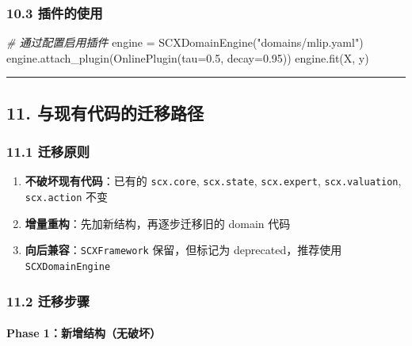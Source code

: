 \documentclass[
  12pt,
]{ctexart}
\newenvironment{Shaded}{}{}
\newcommand{\CommentTok}[1]{\textcolor[rgb]{0.38,0.63,0.69}{\textit{#1}}}
\newcommand{\FloatTok}[1]{\textcolor[rgb]{0.25,0.63,0.44}{#1}}
\newcommand{\NormalTok}[1]{#1}
\newcommand{\OperatorTok}[1]{\textcolor[rgb]{0.40,0.40,0.40}{#1}}
\newcommand{\StringTok}[1]{\textcolor[rgb]{0.25,0.44,0.63}{#1}}
\providecommand{\tightlist}{%
  \setlength{\itemsep}{0pt}\setlength{\parskip}{0pt}}
\begin{document}
\subsubsection{10.3 插件的使用}\label{ux63d2ux4ef6ux7684ux4f7fux7528}

\begin{Shaded}
\begin{Highlighting}[]
\CommentTok{\# 通过配置启用插件}
\NormalTok{engine }\OperatorTok{=}\NormalTok{ SCXDomainEngine(}\StringTok{"domains/mlip.yaml"}\NormalTok{)}
\NormalTok{engine.attach\_plugin(OnlinePlugin(tau}\OperatorTok{=}\FloatTok{0.5}\NormalTok{, decay}\OperatorTok{=}\FloatTok{0.95}\NormalTok{))}
\NormalTok{engine.fit(X, y)}
\end{Highlighting}
\end{Shaded}

\begin{center}\rule{0.5\linewidth}{0.5pt}\end{center}

\subsection{11.
与现有代码的迁移路径}\label{ux4e0eux73b0ux6709ux4ee3ux7801ux7684ux8fc1ux79fbux8defux5f84}

\subsubsection{11.1 迁移原则}\label{ux8fc1ux79fbux539fux5219}

\begin{enumerate}
\def\labelenumi{\arabic{enumi}.}
\tightlist
\item
  \textbf{不破坏现有代码}：已有的 \texttt{scx.core}, \texttt{scx.state},
  \texttt{scx.expert}, \texttt{scx.valuation}, \texttt{scx.action} 不变
\item
  \textbf{增量重构}：先加新结构，再逐步迁移旧的 domain 代码
\item
  \textbf{向后兼容}：\texttt{SCXFramework} 保留，但标记为
  deprecated，推荐使用 \texttt{SCXDomainEngine}
\end{enumerate}

\subsubsection{11.2 迁移步骤}\label{ux8fc1ux79fbux6b65ux9aa4}

\paragraph{Phase
1：新增结构（无破坏）}\label{phase-1ux65b0ux589eux7ed3ux6784ux65e0ux7834ux574f}
\end{document}
